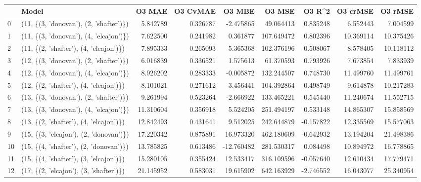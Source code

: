 \begin{tabular}{llrrrrrrr}
\toprule
{} &                                   Model &     O3 MAE &  O3 CvMAE &     O3 MBE &      O3 MSE &    O3 R\textasciicircum2 &   O3 crMSE &    O3 rMSE \\
\midrule
0  &  (11, \{(3, 'donovan'), (2, 'shafter')\}) &   5.842789 &  0.326787 &  -2.475865 &   49.064413 &  0.835248 &   6.552443 &   7.004599 \\
1  &  (11, \{(3, 'donovan'), (4, 'elcajon')\}) &   7.622500 &  0.241982 &   0.361877 &  107.649472 &  0.802396 &  10.369114 &  10.375426 \\
2  &  (11, \{(2, 'shafter'), (4, 'elcajon')\}) &   7.895333 &  0.265093 &   5.365368 &  102.376196 &  0.508067 &   8.578405 &  10.118112 \\
3  &  (12, \{(3, 'donovan'), (2, 'shafter')\}) &   6.016839 &  0.336521 &   1.575613 &   61.370593 &  0.793926 &   7.673854 &   7.833939 \\
4  &  (12, \{(3, 'donovan'), (4, 'elcajon')\}) &   8.926202 &  0.283333 &  -0.005872 &  132.244507 &  0.748730 &  11.499760 &  11.499761 \\
5  &  (12, \{(2, 'shafter'), (4, 'elcajon')\}) &   8.101021 &  0.271612 &   3.456441 &  104.392864 &  0.498749 &   9.614878 &  10.217283 \\
6  &  (13, \{(3, 'donovan'), (2, 'shafter')\}) &   9.261994 &  0.523264 &  -2.666922 &  133.465221 &  0.545440 &  11.240674 &  11.552715 \\
7  &  (13, \{(3, 'donovan'), (4, 'elcajon')\}) &  11.310604 &  0.356918 &   5.524205 &  251.494197 &  0.533148 &  14.865307 &  15.858569 \\
8  &  (13, \{(2, 'shafter'), (4, 'elcajon')\}) &  12.842493 &  0.431641 &   9.512025 &  242.644879 & -0.157822 &  12.335569 &  15.577063 \\
9  &  (15, \{(3, 'elcajon'), (2, 'donovan')\}) &  17.220342 &  0.875891 &  16.973320 &  462.180609 & -0.642932 &  13.194204 &  21.498386 \\
10 &  (15, \{(4, 'shafter'), (2, 'donovan')\}) &  13.785825 &  0.613486 & -12.760482 &  281.530317 &  0.084498 &  10.894972 &  16.778865 \\
11 &  (15, \{(4, 'shafter'), (3, 'elcajon')\}) &  15.280105 &  0.355424 &  12.533417 &  316.109596 & -0.057640 &  12.610434 &  17.779471 \\
12 &  (17, \{(2, 'elcajon'), (3, 'shafter')\}) &  21.145952 &  0.583031 &  19.615902 &  642.163929 & -2.746552 &  16.043077 &  25.340954 \\

\end{tabular}
